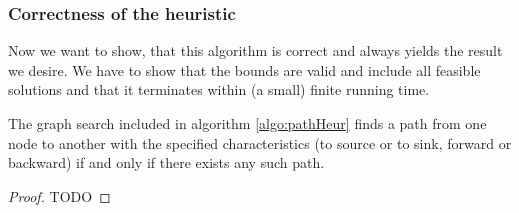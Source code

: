 \newpage 
\subsubsection{Correctness of the heuristic}
Now we want to show, that this algorithm is correct and always yields the result we desire. We have to show that the 
bounds are valid and include all feasible solutions and that it terminates within (a small) finite running time.

\begin{lemma}\label{lemma:graphSearch}
 The graph search included in algorithm \ref{algo:pathHeur} finds a path from one node to another with the specified 
characteristics (to source or to sink, forward or backward) if and only if there exists any such path.
\end{lemma}
\begin{proof}
 TODO
\end{proof}



